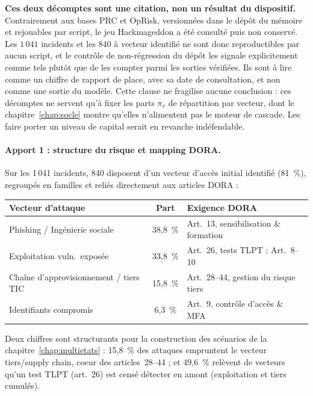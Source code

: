 \begin{attention}
\textbf{Ces deux décomptes sont une citation, non un résultat du dispositif.} Contrairement
aux bases PRC et OpRisk, versionnées dans le dépôt du mémoire et rejouables par script, le
jeu Hackmageddon a été consulté puis non conservé. Les $1\,041$ incidents et les
$840$ à vecteur identifié ne sont donc reproductibles par aucun script, et le contrôle de
non-régression du dépôt les signale explicitement comme tels plutôt que de les compter parmi
les sorties vérifiées. Ils sont à lire comme un chiffre de rapport de place, avec sa date de
consultation, et non comme une sortie du modèle. Cette clause ne fragilise aucune conclusion :
ces décomptes ne servent qu'à fixer les parts $\pi_v$ de répartition par vecteur, dont le
chapitre~\ref{chap:socle} montre qu'elles n'alimentent pas le moteur de cascade. Les faire
porter un niveau de capital serait en revanche indéfendable.
\end{attention}

\paragraph{Apport 1 : structure du risque et mapping DORA.} Sur les 1\,041
incidents, 840 disposent d'un vecteur d'accès initial identifié (81~\%),
regroupés en familles et reliés directement aux articles DORA :

\begin{center}
\renewcommand{\arraystretch}{1.3}
\begin{tabular}{>{\raggedright}p{5cm} c >{\raggedright\arraybackslash}p{6cm}}
\toprule
\rowcolor{lightblue}
\textbf{Vecteur d'attaque} & \textbf{Part} & \textbf{Exigence DORA} \\
\midrule
Phishing / Ingénierie sociale & 38{,}8~\% & Art.~13, sensibilisation \& formation \\
Exploitation vuln.\ exposée & 33{,}8~\% & Art.~26, tests TLPT ; Art.~8--10 \\
Chaîne d'approvisionnement / tiers TIC & 15{,}8~\% & Art.~28--44, gestion du risque tiers \\
Identifiants compromis & 6{,}3~\% & Art.~9, contrôle d'accès \& MFA \\
\bottomrule
\end{tabular}
\end{center}

Deux chiffres sont structurants pour la construction des scénarios de la
chapitre~\ref{chap:multietats} : 15{,}8~\% des attaques empruntent le vecteur tiers/supply
chain, coeur des articles~28--44 ; et 49{,}6~\% relèvent de vecteurs
qu'un test TLPT (art.~26) est censé détecter en amont (exploitation et
tiers cumulés).

